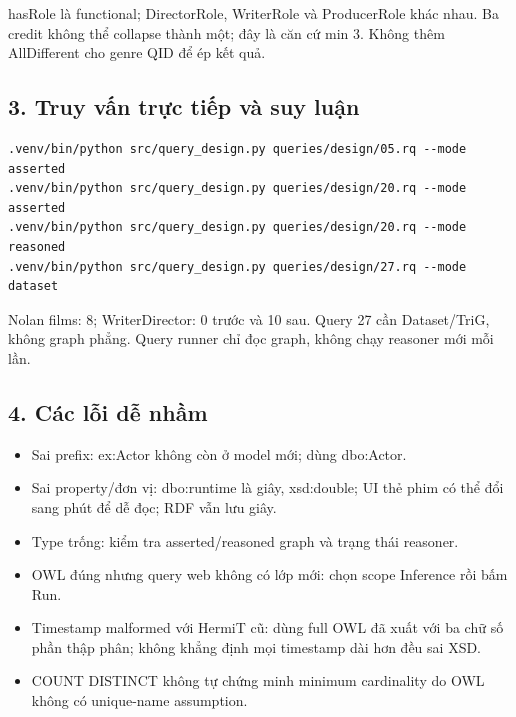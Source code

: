\documentclass[
  11pt,
]{article}
\providecommand{\tightlist}{%
  \setlength{\itemsep}{0pt}\setlength{\parskip}{0pt}}
\begin{document}
hasRole là functional; Director\allowbreak{}\allowbreak{}Role,
WriterRole và ProducerRole khác nhau. Ba credit không thể collapse thành
một; đây là căn cứ min 3. Không thêm AllDifferent cho genre QID để ép
kết quả.

\subsection{3. Truy vấn trực tiếp và suy
luận}\label{truy-vux1ea5n-trux1ef1c-tiux1ebfp-vuxe0-suy-luux1eadn}

\begin{verbatim}
.venv/bin/python src/query_design.py queries/design/05.rq --mode asserted
.venv/bin/python src/query_design.py queries/design/20.rq --mode asserted
.venv/bin/python src/query_design.py queries/design/20.rq --mode reasoned
.venv/bin/python src/query_design.py queries/design/27.rq --mode dataset
\end{verbatim}

Nolan films: 8; Writer\allowbreak{}Di\allowbreak{}rector:\allowbreak{} 0
trước và 10 sau. Query 27 cần
Dataset/\allowbreak{}\allowbreak{}Tri\allowbreak{}G, không graph phẳng.
Query runner chỉ đọc graph, không chạy reasoner mới mỗi lần.

\subsection{4. Các lỗi dễ nhầm}\label{cuxe1c-lux1ed7i-dux1ec5-nhux1ea7m}

\begin{itemize}
\tightlist
\item
  Sai prefix: ex:Actor không còn ở model mới; dùng dbo:Actor.
\item
  Sai property/đơn vị: dbo:runtime là giây, xsd:double; UI thẻ phim có
  thể đổi sang phút để dễ đọc; RDF vẫn lưu giây.
\item
  Type trống: kiểm tra
  asserted\allowbreak{}/\allowbreak{}reasone\allowbreak{}d graph và
  trạng thái reasoner.
\item
  OWL đúng nhưng query web không có lớp mới: chọn scope Inference rồi
  bấm Run.
\item
  Timestamp malformed với HermiT cũ: dùng full OWL đã xuất với ba chữ số
  phần thập phân; không khẳng định mọi timestamp dài hơn đều sai XSD.
\item
  COUNT DISTINCT không tự chứng minh minimum cardinality do OWL không có
  unique-name assumption.
\end{itemize}
\end{document}
